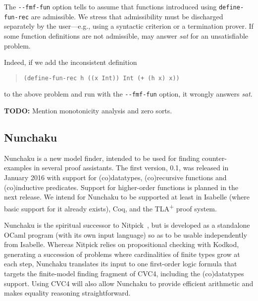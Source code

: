 The \texttt{-}\texttt{-fmf-fun} option tells \cvc to assume that
functions introduced using \texttt{define-\allowbreak fun-\allowbreak rec} are admissible.
We stress that admissibility must be discharged separately by the user---e.g., using a
syntactic criterion or a termination prover.
If some function definitions are not admissible, \cvc may answer \emph{sat} for
an unsatisfiable problem. 
\begin{rep}
Indeed, if we add the inconsistent definition
%
\begin{quote}
\begin{verbatim}
(define-fun-rec h ((x Int)) Int (+ (h x) x))
\end{verbatim}
\end{quote}
%
to the above problem and run \cvc with the \texttt{-}\texttt{-fmf-fun} option,
it wrongly answers \emph{sat}.
\end{rep}

\textbf{TODO:} Mention monotonicity analysis and zero sorts.


\subsection{Nunchaku}
\label{ssec:nunchaku}

Nunchaku is a new model finder, intended
to be used for finding counter-examples in several proof assistants. The
first version, 0.1, was released in January 2016 with support for (co)datatypes,
(co)recursive functions and (co)inductive predicates.
Support for higher-order
functions is planned in the next release.
We intend for Nunchaku to be supported at least in Isabelle (where basic
support for it already exists), Coq, and the TLA\textsuperscript{+} proof
system.

Nunchaku is the spiritual successor to Nitpick~\cite{blanchette-nipkow-2010},
but is developed as a standalone OCaml program (with its own input language) so
as to be usable independently from Isabelle.
Whereas Nitpick relies on propositional checking with Kodkod,
generating a succession of problems where cardinalities of finite types
grow at each step, Nunchaku
translates its input to one first-order logic formula that targets
the finite-model finding fragment of CVC4, including the (co)datatypes support.
Using CVC4 will also allow Nunchaku to provide efficient arithmetic and makes
equality reasoning straightforward.

